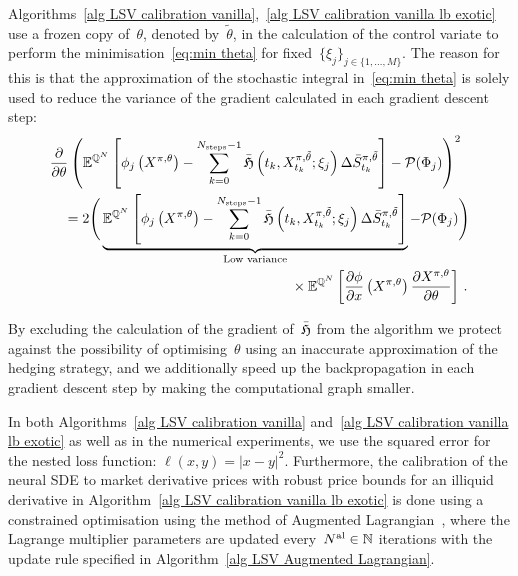 Algorithms~\ref{alg LSV calibration vanilla},~\ref{alg LSV calibration vanilla lb exotic} use a frozen copy of~$\theta$, denoted by~$\tilde \theta$, in the calculation of the control variate to perform the minimisation~\eqref{eq:min theta} for fixed~$\{\xi_j\}_{j\in\{1,\ldots,M\}}$. The reason for this is that the approximation of the stochastic integral in~\eqref{eq:min theta} is solely used to reduce the variance of the gradient calculated in each gradient descent step:
\begin{align*}
    &\frac{\partial}{\partial \theta}\left( \EE^{\QQ^N}
     \left[\phi_j\left( X^{\pi,\theta} \right) - \sum_{k=0}^{N_{\text{steps}}-1}\bar{\Hf}\left(t_k, X_{t_k}^{\pi,\tilde \theta}; \xi_{j}\right)\Delta \bar{S}^{\pi,\tilde \theta}_{t_{k}} \right]-\Pp(\Phi_j)\right)^2 \\
    & \quad = 2 \Bigg( \underbrace{ \EE^{\QQ^N}
     \left[\phi_j\left( X^{\pi,\theta} \right) - \sum_{k=0}^{N_{\text{steps}}-1}\bar{\Hf}\left(t_k, X_{t_k}^{\pi,\tilde \theta}; \xi_{j}\right)\Delta \bar{S}^{\pi,\tilde \theta}_{t_{k}} \right] }_{\text{Low variance}}-\Pp(\Phi_j)\Bigg) \\
     & \hskip0.5\textwidth  \times \EE^{\QQ^N} \left[\frac{\partial \phi}{\partial x}\left(X^{\pi, \theta}\right)\frac{\partial X^{\pi,\theta}}{\partial \theta}\right] \,.
\end{align*}

By excluding the calculation of the gradient of~$\bar{\mathfrak{H}}$ from the algorithm we protect against the possibility of optimising~$\theta$ using an inaccurate approximation of the hedging strategy, and we additionally speed up the backpropagation in each gradient descent step by making the computational graph smaller. 


In both Algorithms~\ref{alg LSV calibration vanilla} and~\ref{alg LSV calibration vanilla lb exotic} as well as in the numerical experiments, we use the squared error for the nested loss function:
$\ell(x,y)=\vert x - y \vert^2$.
Furthermore, the calibration of the neural SDE to market derivative prices with robust price bounds for an illiquid derivative in Algorithm~\ref{alg LSV calibration vanilla lb exotic}
is done using a constrained optimisation using the method of Augmented Lagrangian~\cite{Hestenes1969MultiplierMethods}, where the Lagrange multiplier parameters are updated every~$N^\textup{al}\in\mathbb{N}$ iterations with the update rule specified in Algorithm~\ref{alg LSV Augmented Lagrangian}. 

